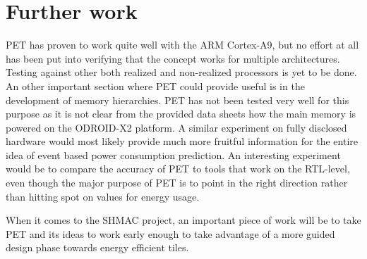 \section{Further work}

PET has proven to work quite well with the ARM Cortex-A9, but no effort at
all has been put into verifying that the concept works for multiple
architectures. Testing against other both realized and non-realized processors
is yet to be done. An other important section where PET could provide useful is in the development of memory
hierarchies. PET has not been tested very well for this purpose as it is not clear from
the provided data sheets how the main memory is powered on the ODROID-X2 platform. A similar
experiment on fully disclosed hardware would most likely provide much more fruitful information
for the entire idea of event based power consumption prediction. An interesting
experiment would be to compare the accuracy of PET to tools that work on the
RTL-level, even though the major purpose of PET is to point in the right
direction rather than hitting spot on values for energy usage.

When it comes to the SHMAC project, an important piece of work will be to take PET and
its ideas to work early enough to take advantage of a more guided design phase towards
energy efficient tiles.

